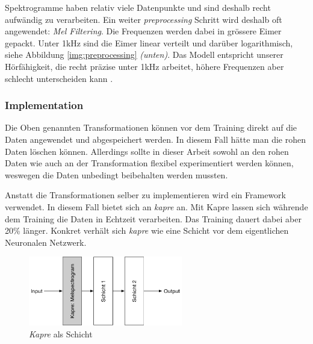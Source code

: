 Spektrogramme haben relativ viele Datenpunkte und sind deshalb recht aufwändig zu verarbeiten. Ein weiter \textit{preprocessing} Schritt wird deshalb oft angewendet: \textit{Mel Filtering}\parencite{mel}. Die Frequenzen werden dabei in grössere Eimer gepackt. Unter 1kHz sind die Eimer linear verteilt und darüber logarithmisch, siehe Abbildung \ref{img:preprocessing} \textit{(unten)}. Das Modell entspricht unserer Hörfähigkeit, die recht präzise unter 1kHz arbeitet, höhere Frequenzen aber schlecht unterscheiden kann \parencite{tenkHz}. 

\subsubsection{Implementation}

Die Oben genannten Transformationen können vor dem Training direkt auf die Daten angewendet und abgespeichert werden. In diesem Fall hätte man die rohen Daten löschen können. Allerdings sollte in dieser Arbeit sowohl an den rohen Daten wie auch an der Transformation flexibel experimentiert werden können, weswegen die Daten unbedingt beibehalten werden mussten. 

Anstatt die Transformationen selber zu implementieren wird ein Framework verwendet. In diesem Fall bietet sich an \textit{kapre}\parencite{kapre} an. Mit Kapre lassen sich währende dem Training die Daten in Echtzeit verarbeiten. Das Training dauert dabei aber 20\% länger. Konkret verhält sich \textit{kapre} wie eine Schicht vor dem eigentlichen Neuronalen Netzwerk.
\begin{figure}[hbt]
	\centering
		\includegraphics[width=0.6\textwidth]{assets/kapre.png}
	\centering
	\caption{\textit{Kapre}\parencite{kapre} als Schicht}
	\label{img:kapre}
\end{figure}

